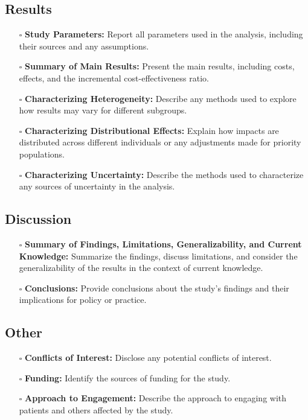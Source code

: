 \documentclass[11pt]{article}
\def\tightlist{}
\begin{document}
\begin{Form}
\subsection{Results}\label{results}

\begin{itemize}
\tightlist
\item[$\square$]
  \textbf{Study Parameters:} Report all parameters used in the analysis,
  including their sources and any assumptions.
\item[$\square$]
  \textbf{Summary of Main Results:} Present the main results, including
  costs, effects, and the incremental cost-effectiveness ratio.
\item[$\square$]
  \textbf{Characterizing Heterogeneity:} Describe any methods used to
  explore how results may vary for different subgroups.
\item[$\square$]
  \textbf{Characterizing Distributional Effects:} Explain how impacts
  are distributed across different individuals or any adjustments made
  for priority populations.
\item[$\square$]
  \textbf{Characterizing Uncertainty:} Describe the methods used to
  characterize any sources of uncertainty in the analysis.
\end{itemize}

\subsection{Discussion}\label{discussion}

\begin{itemize}
\tightlist
\item[$\square$]
  \textbf{Summary of Findings, Limitations, Generalizability, and
  Current Knowledge:} Summarize the findings, discuss limitations, and
  consider the generalizability of the results in the context of current
  knowledge.
\item[$\square$]
  \textbf{Conclusions:} Provide conclusions about the study's findings
  and their implications for policy or practice.
\end{itemize}

\subsection{Other}\label{other}

\begin{itemize}
\tightlist
\item[$\square$]
  \textbf{Conflicts of Interest:} Disclose any potential conflicts of
  interest.
\item[$\square$]
  \textbf{Funding:} Identify the sources of funding for the study.
\item[$\square$]
  \textbf{Approach to Engagement:} Describe the approach to engaging
  with patients and others affected by the study.
\end{itemize}


\end{Form}
\end{document}
